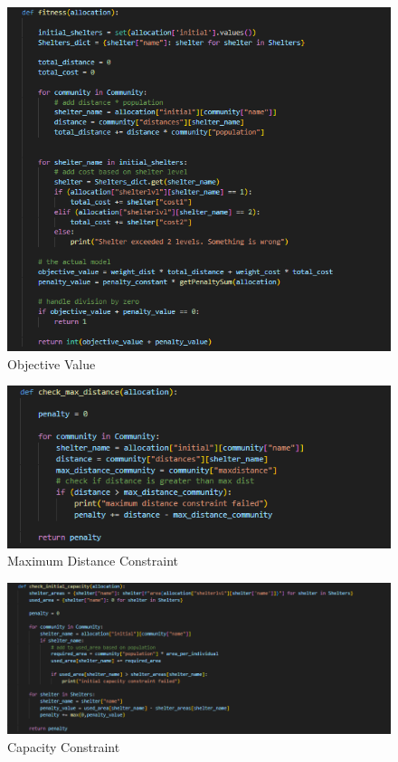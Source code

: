 \begin{appendices}
\begin{centerappendixtitle}
		\begin{figure}[h]
			\centering
			\caption{Objective Value}
			\label{objValCode}
			\includegraphics[width=\linewidth]{appendix/fitness}
		\end{figure}
		
		\begin{figure}[h]
			\centering
			\caption{Maximum Distance Constraint}
			\label{maxdistCode}
			\includegraphics[width=\linewidth]{appendix/dist const}
		\end{figure}
		
		\begin{figure}[h]
			\centering
			\caption{Capacity Constraint}
			\label{capCode}
			\includegraphics[width=\linewidth]{appendix/capacity const}
		\end{figure}
		

\end{centerappendixtitle}
\end{appendices}
